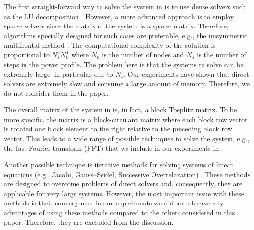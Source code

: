 The first straight-forward way to solve the system in  is to use dense solvers such as the LU decomposition \cite{press2007}. However, a more advanced approach is to employ sparse solvers since the matrix of the system is a sparse matrix. Therefore, algorithms specially designed for such cases are preferable, e.g., the unsymmetric multifrontal method . The computational complexity of the solution is proportional to $N_s^3 N_n^3$ \cite{press2007} where $N_n$ is the number of nodes and $N_s$ is the number of steps in the power profile. The problem here is that the systems to solve can be extremely large, in particular due to $N_s$. Our experiments have shown that direct solvers are extremely slow and consume a large amount of memory. Therefore, we do not consider them in the paper.

The overall matrix of the system in  is, in fact, a block Toeplitz matrix. To be more specific, the matrix is a block-circulant matrix where each block row vector is rotated one block element to the right relative to the preceding block row vector. This leads to a wide range of possible techniques to solve the system, e.g., the fast Fourier transform (FFT)  that we include in our experiments in .

Another possible technique is iterative methods for solving systems of linear equations (e.g., Jacobi, Gauss--Seidel, Successive Overrelaxation) \cite{press2007}. These methods are designed to overcome problems of direct solvers and, consequently, they are applicable for very large systems. However, the most important issue with these methods is their convergence. In our experiments we did not observe any advantages of using these methods compared to the others considered in this paper. Therefore, they are excluded from the discussion.
